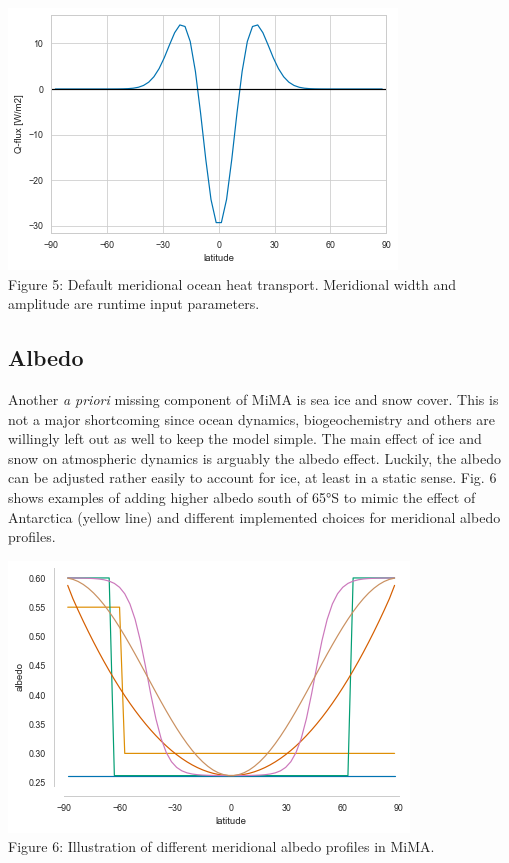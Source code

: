 \includegraphics{qflux.png}\\
Figure 5: Default meridional ocean heat transport. Meridional width and
amplitude are runtime input parameters.

\subsection{Albedo}\label{albedo}

Another \emph{a priori} missing component of MiMA is sea ice and snow
cover. This is not a major shortcoming since ocean dynamics,
biogeochemistry and others are willingly left out as well to keep the
model simple. The main effect of ice and snow on atmospheric dynamics is
arguably the albedo effect. Luckily, the albedo can be adjusted rather
easily to account for ice, at least in a static sense. Fig. 6 shows
examples of adding higher albedo south of 65°S to mimic the effect of
Antarctica (yellow line) and different implemented choices for
meridional albedo profiles.

\includegraphics{albedo.png}\\
Figure 6: Illustration of different meridional albedo profiles in MiMA.


